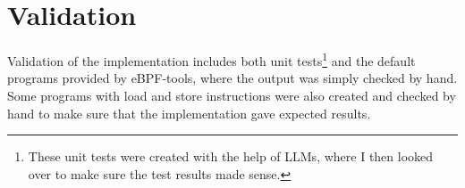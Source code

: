 \section{Validation}
Validation of the implementation includes both unit tests\footnote{These
unit tests were created with the help of LLMs, where I then looked over to make
sure the test results made sense.} and the default programs provided by
eBPF-tools, where the output was simply checked by hand. Some programs with
load and store instructions were also created and checked by hand to make sure
that the implementation gave expected results.

